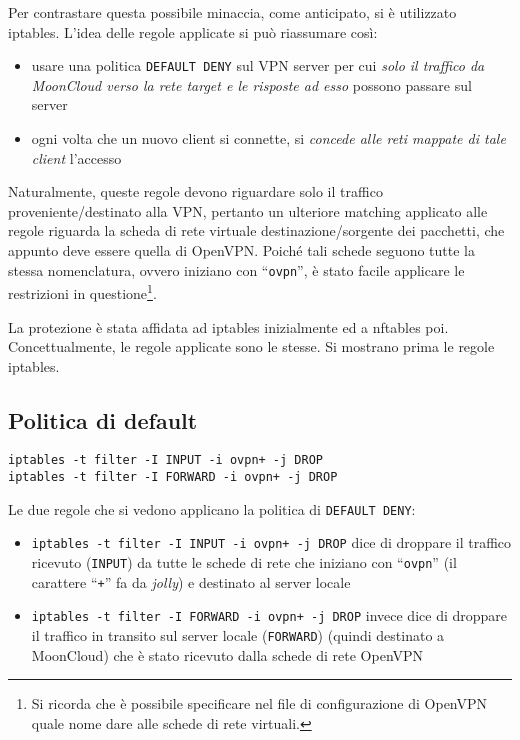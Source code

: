  
Per contrastare questa possibile minaccia, come anticipato, si è utilizzato iptables.
L'idea delle regole applicate si può riassumare così:
\begin{itemize}
	\item usare una politica \texttt{DEFAULT DENY} sul VPN server per cui \textit{solo
		il traffico da MoonCloud verso la rete target e le risposte ad esso} possono passare sul server
		\item ogni volta che un nuovo client si connette, si \textit{concede alle reti
			mappate di tale client} l'accesso
\end{itemize}
		
Naturalmente, queste regole devono riguardare solo il traffico proveniente/destinato
alla VPN, pertanto un ulteriore matching applicato alle regole riguarda la scheda di
rete virtuale destinazione/sorgente dei pacchetti, che appunto deve essere quella
di OpenVPN. Poiché tali schede seguono tutte la stessa nomenclatura, ovvero iniziano con
``\texttt{ovpn}'', è stato facile applicare le restrizioni in questione\footnote{Si ricorda che
è possibile specificare nel file di configurazione di OpenVPN quale nome dare alle schede di rete
virtuali.}.

La protezione è stata affidata ad iptables inizialmente ed a nftables poi. Concettualmente,
le regole applicate sono le stesse. Si mostrano prima le regole iptables.
		
\subsection{Politica di default}
		
\begin{verbatim}
iptables -t filter -I INPUT -i ovpn+ -j DROP
iptables -t filter -I FORWARD -i ovpn+ -j DROP
\end{verbatim}
		
		Le due regole che si vedono applicano la politica di \texttt{DEFAULT DENY}:
		\begin{itemize}
			\item \texttt{iptables -t filter -I INPUT -i ovpn+ -j DROP} dice di droppare
			      il traffico ricevuto (\texttt{INPUT})
			      da tutte le schede di rete che iniziano con ``\texttt{ovpn}''
			      (il carattere ``\texttt{+}'' fa da \textit{jolly}) e destinato al server locale
			\item \texttt{iptables -t filter -I FORWARD -i ovpn+ -j DROP} invece dice
			      di droppare il traffico in transito sul server locale (\texttt{FORWARD}) (quindi
			      destinato a MoonCloud)
			      che è stato ricevuto dalla schede di rete OpenVPN
		\end{itemize}
		
